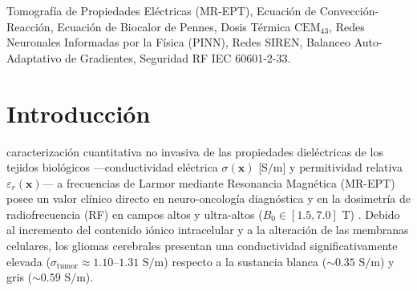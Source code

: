 \documentclass[10pt,journal,compsoc]{IEEEtran}
\begin{document}
\begin{abstract}
\end{abstract}

\begin{IEEEkeywords}
Tomografía de Propiedades Eléctricas (MR-EPT), Ecuación de Convección-Reacción, Ecuación de Biocalor de Pennes, Dosis Térmica $\text{CEM}_{43}$, Redes Neuronales Informadas por la Física (PINN), Redes SIREN, Balanceo Auto-Adaptativo de Gradientes, Seguridad RF IEC 60601-2-33.
\end{IEEEkeywords}

\section{Introducción}
 caracterización cuantitativa no invasiva de las propiedades dieléctricas de los tejidos biológicos —conductividad eléctrica $\sigma(\mathbf{x})$ [$\text{S/m}$] y permitividad relativa $\varepsilon_r(\mathbf{x})$— a frecuencias de Larmor mediante Resonancia Magnética (MR-EPT) posee un valor clínico directo en neuro-oncología diagnóstica y en la dosimetría de radiofrecuencia (RF) en campos altos y ultra-altos ($B_0 \in [1.5, 7.0]\text{ T}$) \cite{katscher2009determination,gabriel1996dielectric}. Debido al incremento del contenido iónico intracelular y a la alteración de las membranas celulares, los gliomas cerebrales presentan una conductividad significativamente elevada ($\sigma_{\text{tumor}} \approx 1.10\text{--}1.31\text{ S/m}$) respecto a la sustancia blanca ($\sim 0.35\text{ S/m}$) y gris ($\sim 0.59\text{ S/m}$).
\end{document}
